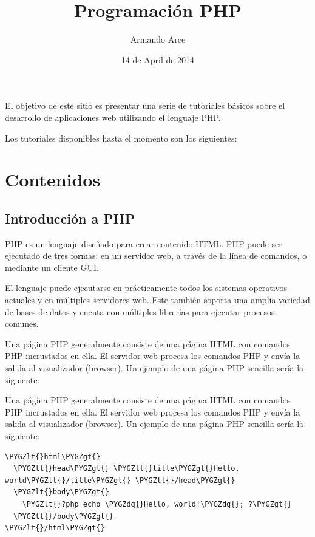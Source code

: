 \documentclass[a5paper,10pt,spanish]{sphinxmanual}
\title{Programación PHP}
\date{14 de April de 2014}
\author{Armando Arce}
\def\PYGZlt{\char`\<}
\def\PYGZgt{\char`\>}
\def\PYGZdq{\char`\"}
\begin{document}
\maketitle
\tableofcontents
{}\label{index::doc}


El objetivo de este sitio es presentar una serie de tutoriales básicos sobre el desarrollo de aplicaciones web utilizando el lenguaje PHP.

Los tutoriales disponibles hasta el momento son los siguientes:


\chapter{Contenidos}
\label{index:contenidos}\label{index:programacion-php}

\section{Introducción a PHP}
\label{Tutorial1_Conceptos.md:introduccion-a-php}\label{Tutorial1_Conceptos.md::doc}
PHP es un lenguaje diseñado para crear contenido HTML. PHP puede ser
ejecutado de tres formas: en un servidor web, a través de la línea de
comandos, o mediante un cliente GUI.

El lenguaje puede ejecutarse en prácticamente todos los sistemas
operativos actuales y en múltiples servidores web. Este también soporta
una amplia variedad de bases de datos y cuenta con múltiples librerías
para ejecutar procesos comunes.

Una página PHP generalmente consiste de una página HTML con comandos PHP
incrustados en ella. El servidor web procesa los comandos PHP y envía la
salida al visualizador (browser). Un ejemplo de una página PHP sencilla
sería la siguiente:

Una página PHP generalmente consiste de una página HTML con comandos PHP
incrustados en ella. El servidor web procesa los comandos PHP y envía la
salida al visualizador (browser). Un ejemplo de una página PHP sencilla
sería la siguiente:

\begin{Verbatim}[commandchars=\\\{\}]
\PYGZlt{}html\PYGZgt{}
  \PYGZlt{}head\PYGZgt{} \PYGZlt{}title\PYGZgt{}Hello, world\PYGZlt{}/title\PYGZgt{} \PYGZlt{}/head\PYGZgt{}
  \PYGZlt{}body\PYGZgt{}
    \PYGZlt{}?php echo \PYGZdq{}Hello, world!\PYGZdq{}; ?\PYGZgt{}
  \PYGZlt{}/body\PYGZgt{}
\PYGZlt{}/html\PYGZgt{}
\end{Verbatim}
\end{document}
